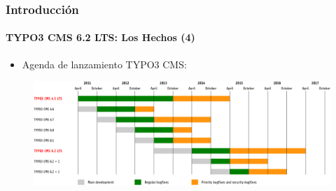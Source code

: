
\begin{frame}[fragile]
	\frametitle{Introducción}
	\framesubtitle{TYPO3 CMS 6.2 LTS: Los Hechos (4)}

	\begin{itemize}
		\item Agenda de lanzamiento TYPO3 CMS:
	\end{itemize}

	\begin{figure}
		\includegraphics[width=0.99\linewidth]{Images/Introduction/ReleaseAgenda.png}
	\end{figure}

\end{frame}


